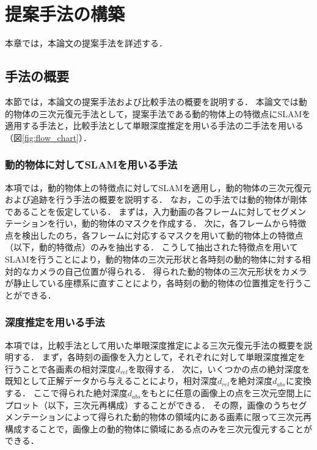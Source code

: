 \section{提案手法の構築}\label{sec:method_creation}
本章では，本論文の提案手法を詳述する．

\subsection{手法の概要}\label{subsec:method_outline}
本節では，本論文の提案手法および比較手法の概要を説明する．
本論文では動的物体の三次元復元手法として，提案手法である動的物体上の特徴点にSLAMを適用する手法と，比較手法として単眼深度推定を用いる手法の二手法を用いる（図\ref{fig:flow_chart}）．

\subsubsection{動的物体に対してSLAMを用いる手法}\label{subsubsec:with_camera_motion}
本項では，動的物体上の特徴点に対してSLAMを適用し，動的物体の三次元復元および追跡を行う手法の概要を説明する．
なお，この手法では動的物体が剛体であることを仮定している．
まずは，入力動画の各フレームに対してセグメンテーションを行い，動的物体のマスクを作成する．
次に，各フレームから特徴点を検出したのち，各フレームに対応するマスクを用いて動的物体上の特徴点（以下，動的特徴点）のみを抽出する．
こうして抽出された特徴点を用いてSLAMを行うことにより，動的物体の三次元形状と各時刻の動的物体に対する相対的なカメラの自己位置が得られる．
得られた動的物体の三次元形状をカメラが静止している座標系に直すことにより，各時刻の動的物体の位置推定を行うことができる．

\subsubsection{深度推定を用いる手法}\label{subsubsec:without_camera_motion}
本項では，比較手法として用いた単眼深度推定による三次元復元手法の概要を説明する．
まず，各時刻の画像を入力として，それぞれに対して単眼深度推定を行うことで各画素の相対深度$d_{rel}$を取得する．
次に，いくつかの点の絶対深度を既知として正解データから与えることにより，相対深度$d_{rel}$を絶対深度$d_{abs}$に変換する．
ここで得られた絶対深度$d_{abs}$をもとに任意の画像上の点を三次元空間上にプロット（以下，三次元再構成）することができる．
その際，画像のうちセグメンテーションによって得られた動的物体の領域内にある画素に限って三次元再構成することで，画像上の動的物体に領域にある点のみを三次元復元することができる．

